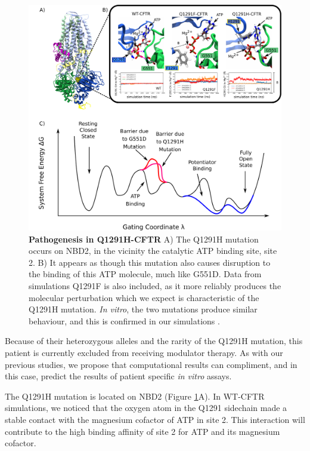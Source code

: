 \begin{figure}
	\begin{center}
		\includegraphics[width=\textwidth]{figures/perspective/Q1291.pdf}
	\end{center}
	\captionsetup{singlelinecheck = false, justification=raggedright}
	\caption[Pathogenesis in Q1291H-CFTR]{\textbf{Pathogenesis in Q1291H-CFTR}{ A) The Q1291H mutation occurs on NBD2, in the vicinity the catalytic ATP binding site, site 2. B) It appears as though this mutation also causes disruption to the binding of this ATP molecule, much like G551D. Data from simulations Q1291F is also included, as it more reliably produces the molecular perturbation which we expect is characteristic of the Q1291H mutation. \textit{In vitro}, the two mutations produce similar behaviour, and this is confirmed in our simulations \cite{dong2015}. }}

	\label{Q1291H_results}

\end{figure}

Because of their heterozygous alleles and the rarity of the Q1291H mutation, this patient is currently excluded from receiving modulator therapy. As with our previous studies, we propose that computational results can compliment, and in this case, predict the results of patient specific \textit{in vitro} assays. 

The Q1291H mutation is located on NBD2 (Figure \ref{Q1291H_results}A). In WT-CFTR simulations, we noticed that the oxygen atom in the  Q1291 sidechain made a stable contact with the magnesium cofactor of ATP in site 2. This interaction will contribute to the high binding affinity of site 2 for ATP and its magnesium cofactor. 

